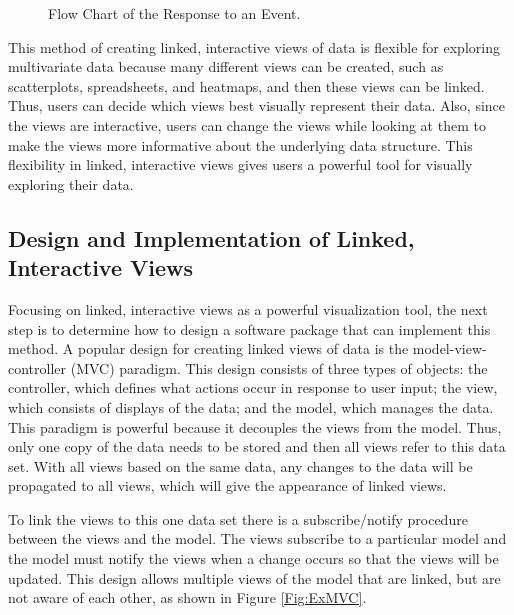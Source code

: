 \documentclass{article}[11pt]
\begin{document}
\begin{figure}[!h]
  \begin{center}    
    \caption{ Flow Chart of the Response to an Event. }
    \label{Fig:Event}
  \end{center}
\end{figure}

This method of creating linked, interactive views of data is flexible for
exploring multivariate data because many different views can be created, such
as scatterplots, spreadsheets, and heatmaps, and then these views can be
linked.  Thus, users can decide which views best visually represent their
data.  Also, since the views are interactive, users can change the views while
looking at them to make the views more informative about the underlying data
structure.  This flexibility in linked, interactive views gives users a
powerful tool for visually exploring their data. 

\subsection{Design and Implementation of Linked, Interactive
  Views}\label{Ssec:Design} 

Focusing on linked, interactive views as a powerful visualization tool, the
next step is to determine how to design a software package that can implement
this method.  A popular design for creating linked views of data is the
model-view-controller (MVC) paradigm.  This design consists of three types
of objects: the controller, which defines what actions occur in response to
user input; the view, which consists of displays of the data; and the model,
which manages the data.  This paradigm is powerful because it decouples the
views from the model.  Thus, only one copy of the data needs to be stored and
then all views refer to this data set.  With all views based on the same data,
any changes to the data will be propagated to all views, which will give the
appearance of linked views.

To link the views to this one data set there is a subscribe/notify procedure
between the views and the model.  The views subscribe to a particular model
and the model must notify the views when a change occurs so that the views
will be updated.  This design allows multiple views of the model that are
linked, but are not aware of each other, as shown in Figure \ref{Fig:ExMVC}.
\end{document}
